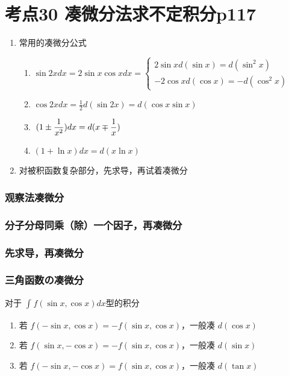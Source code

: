 \section{考点30 凑微分法求不定积分p117}

\begin{enumerate}
    \item 常用的凑微分公式
        \begin{enumerate}
        \item $\sin 2xdx=2\sin x\cos xdx=\left\{
            \begin{array}{cl}
                2\sin xd(\sin x)=d(\sin^2 x)\\
                -2\cos x d(\cos x)=-d(\cos^2 x)
            \end{array}\right.$
        \item $\cos 2xdx=\frac{1}{2}d(\sin 2x)=d(\cos x\sin x)$
        \item $\displaystyle\hspace{.2em}(1\pm \frac{1}{x^2})dx=d(x\mp \frac{1}{x})$
        \item $(1+\ln x)dx=d(x\ln x)$
    \end{enumerate}
    \item 对被积函数复杂部分，先求导，再试着凑微分
\end{enumerate}

\subsubsection{观察法凑微分}

\subsubsection{分子分母同乘（除）一个因子，再凑微分}

\subsubsection{先求导，再凑微分}

\subsubsection{三角函数の凑微分}

对于 $\int_{}^{}f(\sin x,\cos x)dx$型的积分

\begin{enumerate}
    \item 若 $f(-\sin x,\cos x)=-f(\sin x,\cos x)$，一般凑 $d(\cos x)$
    \item 若 $f(\sin x,-\cos x)=-f(\sin x,\cos x)$，一般凑 $d(\sin x)$
    \item 若 $f(-\sin x,-\cos x)=f(\sin x,\cos x)$，一般凑 $d(\tan x)$
\end{enumerate}

